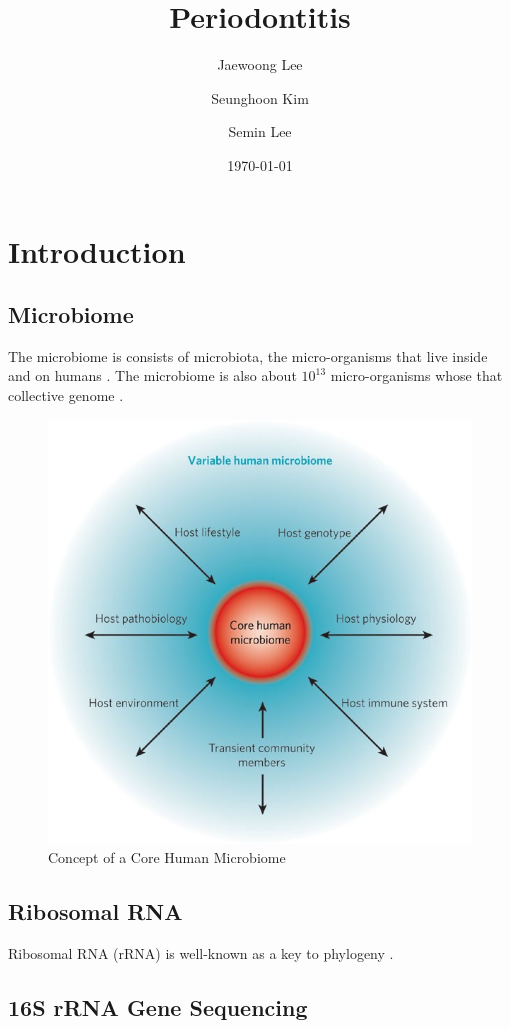 \documentclass[a4paper]{article}
\title{Periodontitis}
\author{
    Jaewoong Lee
    \and
    Seunghoon Kim
    \and
    Semin Lee
}
\date{\today}
\begin{document}
   	\maketitle
    \newpage

    \tableofcontents
    \listoftables
    \listoffigures
    \newpage

    \section{Introduction}
        \subsection{Microbiome}
            The microbiome is consists of microbiota, the micro-organisms that live inside and on humans \cite{microbiome1}. The microbiome is also about $10^{13}$ micro-organisms whose that collective genome \cite{microbiome2}.

            \begin{figure}[p]
                \centering
                \includegraphics[width=0.5 \linewidth]{figures/microbiome.jpg}
                \caption{Concept of a Core Human Microbiome \protect\cite{microbiome1}}
                \label{fig:microbiome-concept}
            \end{figure}

        \subsection{Ribosomal RNA}
            Ribosomal RNA (rRNA) is well-known as a key to phylogeny \cite{rRNA1}.

        \subsection{16S rRNA Gene Sequencing}
\end{document}
